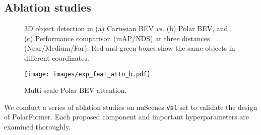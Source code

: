 \documentclass[letterpaper]{article} \usepackage{aaai23}  \usepackage{times}  \usepackage{helvet}  \usepackage{courier}  \usepackage[hyphens]{url}  \usepackage{graphicx} \urlstyle{rm} \def\UrlFont{\rm}  \usepackage{natbib}  \usepackage{caption} \frenchspacing  \setlength{\pdfpagewidth}{8.5in} \setlength{\pdfpageheight}{11in} \usepackage{algorithm}
\begin{document}
\subsection{Ablation studies}
\begin{figure*}[t]

\begin{minipage}[b]{.27\linewidth}
    \centering
\end{minipage}
\begin{minipage}[b]{.69\linewidth}
    \centering
    
\end{minipage} \caption{
3D object detection in (a) Cartesian BEV {\em vs.} (b) Polar BEV, and (c) Performance comparison (mAP/NDS) at three distances (Near/Medium/Far). 
Red and green boxes show the same objects in different coordinates.
}
\label{fig:polarcardi}
\end{figure*} 



\begin{figure}[ht]
\centering
 \texttt{[image: images/exp\_feat\_attn\_b.pdf]}
 \caption{Multi-scale Polar BEV attention.}
 \label{fig:query_attn}
\end{figure} We conduct a series of ablation studies on nuScenes \texttt{val} set to 
validate the design of PolarFormer.
Each proposed component and important hyperparameters are examined thoroughly.
\end{document}

